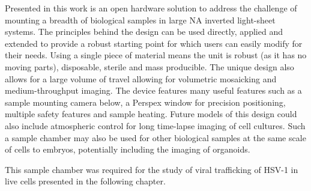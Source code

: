 Presented in this work is an open hardware solution to address the challenge of mounting a breadth of biological samples in large \gls{NA} inverted light-sheet systems.
The principles behind the design can be used directly, applied and extended to provide a robust starting point for which users can easily modify for their needs.
Using a single piece of  material means the unit is robust (as it has no moving parts), disposable, sterile and mass producible.
The unique design also allows for a large volume of travel allowing for volumetric mosaicking and medium-throughput imaging.
The device features many useful features such as a sample mounting camera below, a Perspex window for precision positioning, multiple safety features and sample heating.
Future models of this design could also include atmospheric control for long time-lapse imaging of cell cultures.
Such a sample chamber may also be used for other biological samples at the same scale of cells to embryos, potentially including the imaging of \gls{organoid}s.

This sample chamber was required for the study of viral trafficking of \gls{HSV}-1 in live cells presented in the following chapter.
%


